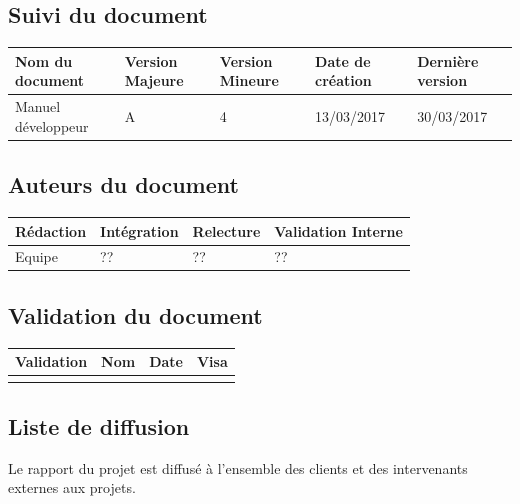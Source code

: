 \documentclass[10pt,a4paper]{article}
\begin{document}
\newpage


\subsection*{Suivi du document}

\begin{center}
    \begin{tabular}{| l | l | l | l | l |}
    \hline
     \rowcolor{gray} Nom du document & Version Majeure & Version Mineure & Date de création & Dernière version \\ \hline
    Manuel développeur & A & 4 & 13/03/2017 & 30/03/2017 \\ \hline
    \end{tabular}
\end{center}


\subsection*{Auteurs du document}

\begin{center}
    \begin{tabular}{| l | l | l | l |}
    \hline
    \rowcolor{gray} Rédaction & Intégration & Relecture & Validation Interne \\ \hline
    Equipe & ?? & ?? & ?? \\ \hline

    \end{tabular}
\end{center}

\subsection*{Validation du document}

\begin{center}
    \begin{tabular}{| l | l | l | l |}
    \hline
     \rowcolor{gray} Validation & Nom & Date & Visa \\ \hline
    & & & \\
     \hline
    \end{tabular}
\end{center}

\subsection*{Liste de diffusion}

Le rapport du projet est diffusé à l'ensemble des clients et des intervenants externes aux projets.
\end{document}
